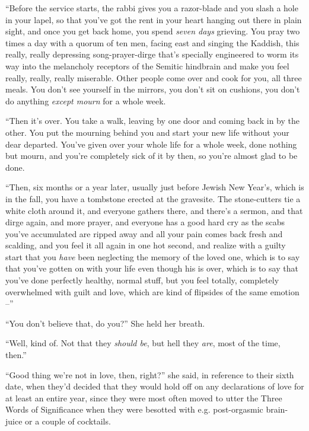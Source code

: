 “Before the service starts, the rabbi gives you a razor-blade and you 
slash a hole in your lapel, so that you've got the rent in your heart 
hanging out there in plain sight, and once you get back home, you spend 
\emph{seven days} grieving. You pray two times a day with a quorum of 
ten men, facing east and singing the Kaddish, this really, really 
depressing song-prayer-dirge that's specially engineered to worm its 
way into the melancholy receptors of the Semitic hindbrain and make you 
feel really, really, really miserable. Other people come over and cook 
for you, all three meals. You don't see yourself in the mirrors, you 
don't sit on cushions, you don't do anything \emph{except mourn} for a 
whole week.

“Then it's over. You take a walk, leaving by one door and coming back 
in by the other. You put the mourning behind you and start your new 
life without your dear departed. You've given over your whole life for 
a whole week, done nothing but mourn, and you're completely sick of it 
by then, so you're almost glad to be done.

“Then, six months or a year later, usually just before Jewish New 
Year's, which is in the fall, you have a tombstone erected at the 
gravesite. The stone-cutters tie a white cloth around it, and everyone 
gathers there, and there's a sermon, and that dirge again, and more 
prayer, and everyone has a good hard cry as the scabs you've 
accumulated are ripped away and all your pain comes back fresh and 
scalding, and you feel it all again in one hot second, and realize with 
a guilty start that you \emph{have} been neglecting the memory of the 
loved one, which is to say that you've gotten on with your life even 
though his is over, which is to say that you've done perfectly healthy, 
normal stuff, but you feel totally, completely overwhelmed with guilt 
and love, which are kind of flipsides of the same emotion --”

“You don't believe that, do you?” She held her breath.

“Well, kind of. Not that they \emph{should be}, but hell they 
\emph{are}, most of the time, then.”

“Good thing we're not in love, then, right?” she said, in reference 
to their sixth date, when they'd decided that they would hold off on 
any declarations of love for at least an entire year, since they were 
most often moved to utter the Three Words of Significance when they 
were besotted with e.g. post-orgasmic brain-juice or a couple of 
cocktails.

